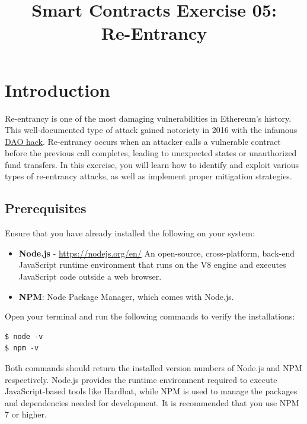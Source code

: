 \documentclass[12pt]{article}
\title{Smart Contracts Exercise 05: \\ Re-Entrancy}
\author{}
\date{}
\begin{document}
\maketitle
\section{Introduction}

Re-entrancy is one of the most damaging vulnerabilities in Ethereum's history. This well-documented type of attack gained notoriety in 2016 with the infamous \href{https://en.wikipedia.org/wiki/The_DAO}{DAO hack}. Re-entrancy occurs when an attacker calls a vulnerable contract before the previous call completes, leading to unexpected states or unauthorized fund transfers. In this exercise, you will learn how to identify and exploit various types of re-entrancy attacks, as well as implement proper mitigation strategies.

\subsection*{Prerequisites}

Ensure that you have already installed the following on your system:

\begin{itemize}
    \item \textbf{Node.js} - \url{https://nodejs.org/en/}
    An open-source, cross-platform, back-end JavaScript runtime environment that runs on the V8 engine and executes JavaScript code outside a web browser. 
    \item \textbf{NPM}: Node Package Manager, which comes with Node.js.
\end{itemize}

Open your terminal and run the following commands to verify the installations:

\begin{verbatim}
$ node -v
$ npm -v
\end{verbatim}

Both commands should return the installed version numbers of Node.js and NPM respectively. Node.js provides the runtime environment required to execute JavaScript-based tools like Hardhat, while NPM is used to manage the packages and dependencies needed for development. It is recommended that you use NPM 7 or higher.

\end{document}
